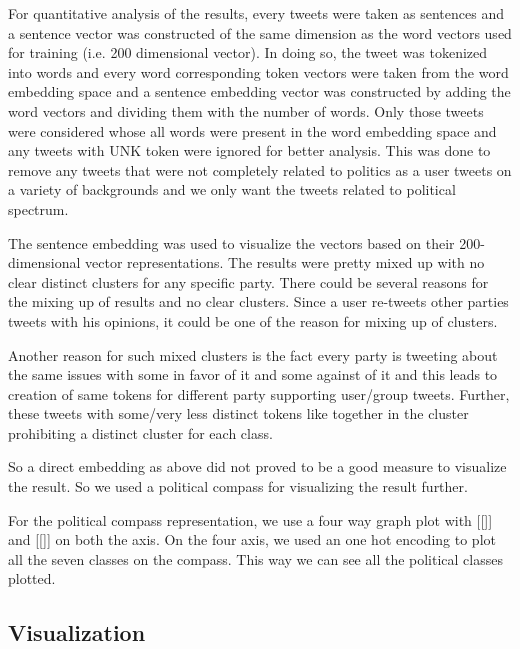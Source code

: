 \documentclass[10pt, oneside]{article}
\begin{document}
\begin{multicols}{2}
For quantitative analysis of the results, every tweets were taken as sentences and a sentence vector was constructed of the same dimension as the word vectors used for training (i.e. 200 dimensional vector). In doing so, the tweet was tokenized into words and every word corresponding token vectors were taken from the word embedding space and a sentence embedding vector was constructed by adding the word vectors and dividing them with the number of words. Only those tweets were considered whose all words were present in the word embedding space and any tweets with UNK token were ignored for better analysis. This was done to remove any tweets that were not completely related to politics as a user tweets on a variety of backgrounds and we only want the tweets related to political spectrum. 

The sentence embedding was used to visualize the vectors based on their 200-dimensional vector representations. The results were pretty mixed up with no clear distinct clusters for any specific party. There could be several reasons for the mixing up of results and no clear clusters. Since a user re-tweets other parties tweets with his opinions, it could be one of the reason for mixing up of clusters. 

Another reason for such mixed clusters is the fact every party is tweeting about the same issues with some in favor of it and some against of it and this leads to creation of same tokens for different party supporting user/group tweets. Further, these tweets with some/very less distinct tokens like together in the cluster prohibiting a distinct cluster for each class.

So a direct embedding as above did not proved to be a good measure to visualize the result. So we used a political compass for visualizing the result further. 

For the political compass representation, we use a four way graph plot with [[]] and [[]] on both the axis. On the four axis, we used an one hot encoding to plot all the seven classes on the compass. This way we can see all the political classes plotted. 

\subsection{Visualization}


\end{multicols}
\end{document}
